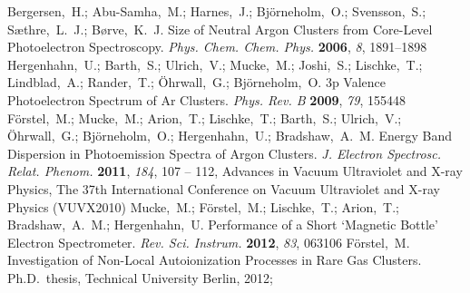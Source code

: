 \documentclass[journal=jpccck,manuscript=article]{achemso}
\begin{document}
\begin{mcitethebibliography}{73}
\mciteBstWouldAddEndPuncttrue
\mciteSetBstMidEndSepPunct{\mcitedefaultmidpunct}
{\mcitedefaultendpunct}{\mcitedefaultseppunct}\relax
\EndOfBibitem
{}
Bergersen,~H.; Abu-Samha,~M.; Harnes,~J.; Bj\"orneholm,~O.; Svensson,~S.;
  S{\ae}thre,~L.~J.; B{\o}rve,~K.~J. Size of Neutral Argon Clusters from
  Core-Level Photoelectron Spectroscopy. \emph{Phys. Chem. Chem. Phys.}
  \textbf{2006}, \emph{8}, 1891--1898\relax
\mciteBstWouldAddEndPuncttrue
\mciteSetBstMidEndSepPunct{\mcitedefaultmidpunct}
{\mcitedefaultendpunct}{\mcitedefaultseppunct}\relax
\EndOfBibitem
{}
Hergenhahn,~U.; Barth,~S.; Ulrich,~V.; Mucke,~M.; Joshi,~S.; Lischke,~T.;
  Lindblad,~A.; Rander,~T.; \"Ohrwall,~G.; Bj\"orneholm,~O. 3p Valence
  Photoelectron Spectrum of Ar Clusters. \emph{Phys. Rev. B} \textbf{2009},
  \emph{79}, 155448\relax
\mciteBstWouldAddEndPuncttrue
\mciteSetBstMidEndSepPunct{\mcitedefaultmidpunct}
{\mcitedefaultendpunct}{\mcitedefaultseppunct}\relax
\EndOfBibitem
{}
F\"orstel,~M.; Mucke,~M.; Arion,~T.; Lischke,~T.; Barth,~S.; Ulrich,~V.;
  \"Ohrwall,~G.; Bj\"orneholm,~O.; Hergenhahn,~U.; Bradshaw,~A.~M. Energy Band
  Dispersion in Photoemission Spectra of Argon Clusters. \emph{J. Electron
  Spectrosc. Relat. Phenom.} \textbf{2011}, \emph{184}, 107 -- 112, Advances in
  Vacuum Ultraviolet and X-ray Physics, The 37th International Conference on
  Vacuum Ultraviolet and X-ray Physics (VUVX2010)\relax
\mciteBstWouldAddEndPuncttrue
\mciteSetBstMidEndSepPunct{\mcitedefaultmidpunct}
{\mcitedefaultendpunct}{\mcitedefaultseppunct}\relax
\EndOfBibitem
{}
Mucke,~M.; F\"orstel,~M.; Lischke,~T.; Arion,~T.; Bradshaw,~A.~M.;
  Hergenhahn,~U. Performance of a Short `Magnetic Bottle' Electron
  Spectrometer. \emph{Rev. Sci. Instrum.} \textbf{2012}, \emph{83},
  063106\relax
\mciteBstWouldAddEndPuncttrue
\mciteSetBstMidEndSepPunct{\mcitedefaultmidpunct}
{\mcitedefaultendpunct}{\mcitedefaultseppunct}\relax
\EndOfBibitem
{}
F\"orstel,~M. Investigation of Non-Local Autoionization Processes in Rare Gas
  Clusters. Ph.D.\ thesis, Technical University Berlin, 2012;

\end{mcitethebibliography}
\end{document}
